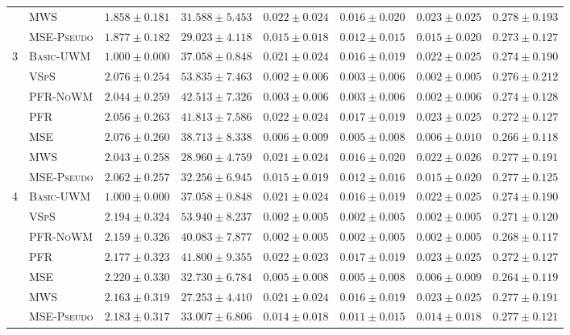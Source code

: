 \begin{table}[!htbp]
{\begin{tabular}{llcccccc}
 & \textsc{MWS} & $1.858 \pm 0.181$ & $31.588 \pm 5.453$ & $0.022 \pm 0.024$ & $0.016 \pm 0.020$ & $0.023 \pm 0.025$ & $0.278 \pm 0.193$ \\
 & \textsc{MSE-Pseudo} & $1.877 \pm 0.182$ & $29.023 \pm 4.118$ & $0.015 \pm 0.018$ & $0.012 \pm 0.015$ & $0.015 \pm 0.020$ & $0.273 \pm 0.127$ \\
\midrule
3 & \textsc{Basic-UWM} & $1.000 \pm 0.000$ & $37.058 \pm 0.848$ & $0.021 \pm 0.024$ & $0.016 \pm 0.019$ & $0.022 \pm 0.025$ & $0.274 \pm 0.190$ \\
 & \textsc{VSpS} & $2.076 \pm 0.254$ & $53.835 \pm 7.463$ & $0.002 \pm 0.006$ & $0.003 \pm 0.006$ & $0.002 \pm 0.005$ & $0.276 \pm 0.212$ \\
 & \textsc{PFR-NoWM} & $2.044 \pm 0.259$ & $42.513 \pm 7.326$ & $0.003 \pm 0.006$ & $0.003 \pm 0.006$ & $0.002 \pm 0.006$ & $0.274 \pm 0.128$ \\
 & \textsc{PFR} & $2.056 \pm 0.263$ & $41.813 \pm 7.586$ & $0.022 \pm 0.024$ & $0.017 \pm 0.019$ & $0.023 \pm 0.025$ & $0.272 \pm 0.127$ \\
 & \textsc{MSE} & $2.076 \pm 0.260$ & $38.713 \pm 8.338$ & $0.006 \pm 0.009$ & $0.005 \pm 0.008$ & $0.006 \pm 0.010$ & $0.266 \pm 0.118$ \\
 & \textsc{MWS} & $2.043 \pm 0.258$ & $28.960 \pm 4.759$ & $0.021 \pm 0.024$ & $0.016 \pm 0.020$ & $0.022 \pm 0.026$ & $0.277 \pm 0.191$ \\
 & \textsc{MSE-Pseudo} & $2.062 \pm 0.257$ & $32.256 \pm 6.945$ & $0.015 \pm 0.019$ & $0.012 \pm 0.016$ & $0.015 \pm 0.020$ & $0.277 \pm 0.125$ \\
\midrule
4 & \textsc{Basic-UWM} & $1.000 \pm 0.000$ & $37.058 \pm 0.848$ & $0.021 \pm 0.024$ & $0.016 \pm 0.019$ & $0.022 \pm 0.025$ & $0.274 \pm 0.190$ \\
 & \textsc{VSpS} & $2.194 \pm 0.324$ & $53.940 \pm 8.237$ & $0.002 \pm 0.005$ & $0.002 \pm 0.005$ & $0.002 \pm 0.005$ & $0.271 \pm 0.120$ \\
 & \textsc{PFR-NoWM} & $2.159 \pm 0.326$ & $40.083 \pm 7.877$ & $0.002 \pm 0.005$ & $0.002 \pm 0.005$ & $0.002 \pm 0.005$ & $0.268 \pm 0.117$ \\
 & \textsc{PFR} & $2.177 \pm 0.323$ & $41.800 \pm 9.355$ & $0.022 \pm 0.023$ & $0.017 \pm 0.019$ & $0.023 \pm 0.025$ & $0.272 \pm 0.127$ \\
 & \textsc{MSE} & $2.220 \pm 0.330$ & $32.730 \pm 6.784$ & $0.005 \pm 0.008$ & $0.005 \pm 0.008$ & $0.006 \pm 0.009$ & $0.264 \pm 0.119$ \\
 & \textsc{MWS} & $2.163 \pm 0.319$ & $27.253 \pm 4.410$ & $0.021 \pm 0.024$ & $0.016 \pm 0.019$ & $0.023 \pm 0.025$ & $0.277 \pm 0.191$ \\
 & \textsc{MSE-Pseudo} & $2.183 \pm 0.317$ & $33.007 \pm 6.806$ & $0.014 \pm 0.018$ & $0.011 \pm 0.015$ & $0.014 \pm 0.018$ & $0.277 \pm 0.121$ \\
\bottomrule
\end{tabular}
}
\end{table}

